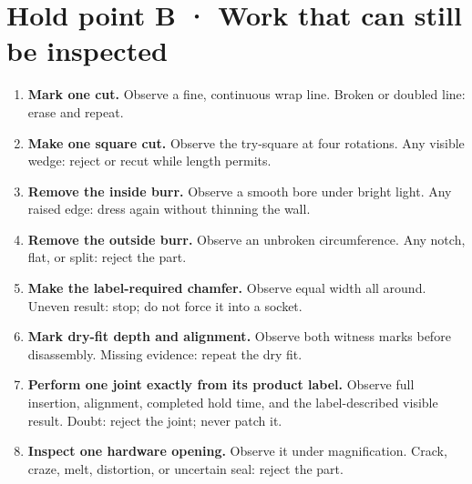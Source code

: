 \section{Hold point B · Work that can still be inspected}
\begin{enumerate}
\item \textbf{Mark one cut.} Observe a fine, continuous wrap line. Broken or
doubled line: erase and repeat.
\item \textbf{Make one square cut.} Observe the try-square at four rotations.
Any visible wedge: reject or recut while length permits.
\item \textbf{Remove the inside burr.} Observe a smooth bore under bright light.
Any raised edge: dress again without thinning the wall.
\item \textbf{Remove the outside burr.} Observe an unbroken circumference.
Any notch, flat, or split: reject the part.
\item \textbf{Make the label-required chamfer.} Observe equal width all around.
Uneven result: stop; do not force it into a socket.
\item \textbf{Mark dry-fit depth and alignment.} Observe both witness marks
before disassembly. Missing evidence: repeat the dry fit.
\item \textbf{Perform one joint exactly from its product label.} Observe full
insertion, alignment, completed hold time, and the label-described visible
result. Doubt: reject the joint; never patch it.
\item \textbf{Inspect one hardware opening.} Observe it under magnification.
Crack, craze, melt, distortion, or uncertain seal: reject the part.
\end{enumerate}

